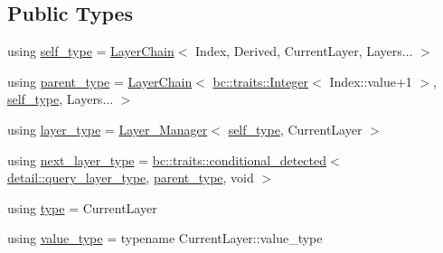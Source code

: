 \subsection*{Public Types}
\begin{DoxyCompactItemize}
\item 
using \hyperlink{structbc_1_1nn_1_1LayerChain_3_01Index_00_01Derived_00_01CurrentLayer_00_01Layers_8_8_8_01_4_a52a79083da32941729956859d6d8a0bb}{self\+\_\+type} = \hyperlink{structbc_1_1nn_1_1LayerChain}{Layer\+Chain}$<$ Index, Derived, Current\+Layer, Layers... $>$
\item 
using \hyperlink{structbc_1_1nn_1_1LayerChain_3_01Index_00_01Derived_00_01CurrentLayer_00_01Layers_8_8_8_01_4_afdc5192517541fe3bfe51cc08f934b43}{parent\+\_\+type} = \hyperlink{structbc_1_1nn_1_1LayerChain}{Layer\+Chain}$<$ \hyperlink{structbc_1_1traits_1_1Integer}{bc\+::traits\+::\+Integer}$<$ Index\+::value+1 $>$, \hyperlink{structbc_1_1nn_1_1LayerChain_3_01Index_00_01Derived_00_01CurrentLayer_00_01Layers_8_8_8_01_4_a52a79083da32941729956859d6d8a0bb}{self\+\_\+type}, Layers... $>$
\item 
using \hyperlink{structbc_1_1nn_1_1LayerChain_3_01Index_00_01Derived_00_01CurrentLayer_00_01Layers_8_8_8_01_4_a5e2199a318777bea811c1cb9cbace037}{layer\+\_\+type} = \hyperlink{structbc_1_1nn_1_1Layer__Manager}{Layer\+\_\+\+Manager}$<$ \hyperlink{structbc_1_1nn_1_1LayerChain_3_01Index_00_01Derived_00_01CurrentLayer_00_01Layers_8_8_8_01_4_a52a79083da32941729956859d6d8a0bb}{self\+\_\+type}, Current\+Layer $>$
\item 
using \hyperlink{structbc_1_1nn_1_1LayerChain_3_01Index_00_01Derived_00_01CurrentLayer_00_01Layers_8_8_8_01_4_aeb548ffae880a4c10cc0947895dc76cd}{next\+\_\+layer\+\_\+type} = \hyperlink{structbc_1_1traits_1_1conditional__detected}{bc\+::traits\+::conditional\+\_\+detected}$<$ \hyperlink{namespacebc_1_1nn_1_1detail_a2ce86e248ef50dbd6eefccc1333e7814}{detail\+::query\+\_\+layer\+\_\+type}, \hyperlink{structbc_1_1nn_1_1LayerChain_3_01Index_00_01Derived_00_01CurrentLayer_00_01Layers_8_8_8_01_4_afdc5192517541fe3bfe51cc08f934b43}{parent\+\_\+type}, void $>$
\item 
using \hyperlink{structbc_1_1nn_1_1LayerChain_3_01Index_00_01Derived_00_01CurrentLayer_00_01Layers_8_8_8_01_4_a685cc5029a546253911f3bb31709d541}{type} = Current\+Layer
\item 
using \hyperlink{structbc_1_1nn_1_1LayerChain_3_01Index_00_01Derived_00_01CurrentLayer_00_01Layers_8_8_8_01_4_adbaa11a40f5d5c6c737b4f61cfd4dc1c}{value\+\_\+type} = typename Current\+Layer\+::value\+\_\+type

\end{DoxyCompactItemize}

